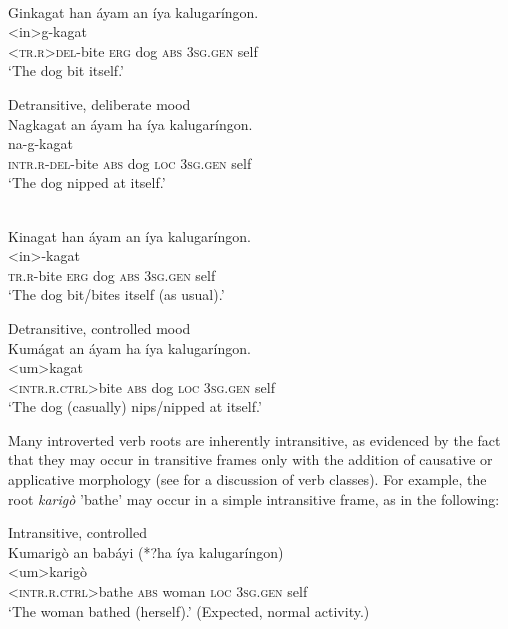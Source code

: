 \documentclass[output=paper]{langscibook}
\begin{document}
\ea
\label{ex:Payne:17}
\\
\glll Ginkagat han áyam an íya kalugaríngon.\\
 <in>g-kagat { } { } { } { } { }\\
\textsc{<tr.r}>\textsc{del-}bite \textsc{erg} dog \textsc{abs} 3\textsc{sg.gen} self\\
\glt ‘The dog bit itself.'
 
\ex 
{Detransitive, deliberate mood}\\
\glll
 {Nagkagat} {an} {áyam} {\-\-ha} {íya} {kalugaríngon.} \\
 na-g-kagat { } { } { } { } { } \\
 \textsc{intr.r-del}{}-bite \textsc{abs} dog \textsc{loc} 3\textsc{sg.gen} self\\
 \glt ‘The dog nipped at itself.'
 
\\
\glll
 {Kinagat} {han} {áyam} {an} {íya} {kalugaríngon.}\\
 <in>-kagat { } { } { } { } { }\\
 \textsc{tr.r}{}-bite \textsc{erg} dog \textsc{abs} 3\textsc{sg.gen} self\\
 \glt ‘The dog bit/bites itself (as usual).'

\ex 
{Detransitive, controlled mood}\\
\glll
 {Kumágat} {an} {áyam} {\-\-ha} {íya} {kalugaríngon.}\\
 <um>kagat { } { } { } { } { } \\
 <\textsc{intr.r.ctrl}>bite \textsc{abs} dog \textsc{loc} 3\textsc{sg.gen} self\\
 \glt ‘The dog (casually) nips/nipped at itself.'
 \z
 \z

Many introverted verb roots are inherently intransitive, as evidenced by the fact that they may occur in transitive frames only with the addition of causative or applicative morphology (see \citealt{OyzonPayneinprep} for a discussion of verb classes). For example, the root \textit{karigò} 'bathe' may occur in a simple intransitive frame, as in the following:

\ea
\label{ex:Payne:18} 
\ea 
Intransitive, controlled\\
\glll
Kumarigò an babáyi (*?ha íya kalugaríngon) \\
<um>karigò { } { } { } { } { }\\
 <\textsc{intr.r.ctrl}>bathe \textsc{abs} woman \textsc{loc} 3\textsc{sg.gen} self\\
\glt ‘The woman bathed (herself).' (Expected, normal activity.)
\end{document}
